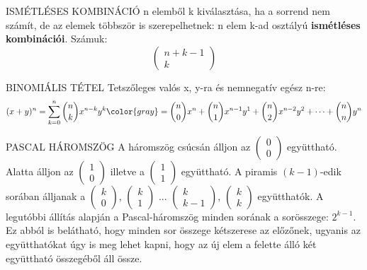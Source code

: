 \begin{definicio}{ISMÉTLÉSES KOMBINÁCIÓ}
n elemből k kiválasztása, ha a sorrend nem számít, de az elemek többször is szerepelhetnek: n elem k-ad osztályú \textbf{ismétléses kombinációi}. Számuk: $$\begin{pmatrix}
n+k-1\\k
\end{pmatrix}$$
\end{definicio}

\begin{tetel}{BINOMIÁLIS TÉTEL}
  Tetszőleges valós x, y-ra és nemnegatív egész n-re:
  \[ (x+y)^n = \sum_{k=0}^{n} \binom{n}{k} x^{n-k}y^{k} {\color{gray} = \binom{n}{0}x^n + \binom{n}{1}x^{n-1}y^1 + \binom{n}{2}x^{n-2}y^2 + \dots + \binom{n}{n}y^n } \]
\end{tetel}

\begin{definicio}{PASCAL HÁROMSZÖG}
A háromszög csúcsán álljon az  $\begin{pmatrix}
0\\0
\end{pmatrix}$ együttható. Alatta álljon az $\begin{pmatrix}
1\\0
\end{pmatrix}$ illetve a $\begin{pmatrix}
1\\1
\end{pmatrix}$ együttható. A piramis $(k-1)$-edik sorában álljanak a $\begin{pmatrix}
k\\0
\end{pmatrix}$, $\begin{pmatrix}
k\\1
\end{pmatrix}$ ... $\begin{pmatrix}
k\\k-1
\end{pmatrix}$, $\begin{pmatrix}
k\\k
\end{pmatrix}$ együtthatók. A legutóbbi állítás alapján a Pascal-háromszög minden sorának a sorösszege:
$2^{k-1}$. Ez abból is belátható, hogy minden sor összege kétszerese az előzőnek, ugyanis az együtthatókat úgy is meg lehet kapni, hogy az új elem a felette álló két együttható összegéből áll össze.
\end{definicio}

